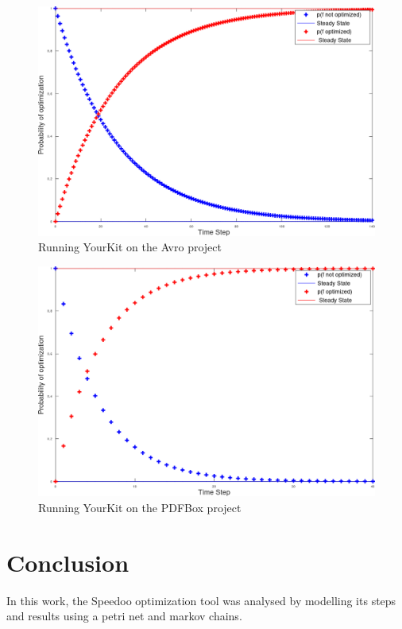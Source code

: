 \documentclass[11pt]{article}
\begin{document}
\begin{figure}[!htbp]
\centering
\includegraphics[scale=0.6]{yourkit-avro.png}
\caption{Running YourKit on the Avro project}
\label{fig:yourkit-avro}
\end{figure}

\begin{figure}[!htbp]
\centering
\includegraphics[scale=0.6]{yourkit-pdfbox.png}
\caption{Running YourKit on the PDFBox project}
\label{fig:yourkit-pdfbox}
\end{figure}

\section*{Conclusion}

In this work, the Speedoo optimization tool was analysed by modelling its steps and results using a petri net and markov chains.
\end{document}
